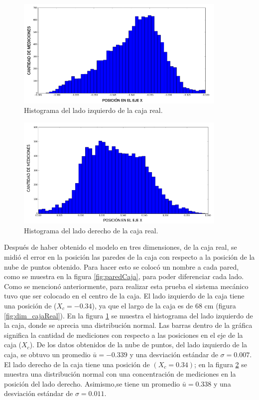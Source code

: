 \begin{figure}
  \centering \footnotesize
  \includegraphics[width=0.90\textwidth]{images/hist_izquierda_caja.png}
  \captionsetup{font=footnotesize}
  \caption{Histograma del lado izquierdo de la caja real.}
  \label{fig:hist_Izq}
\end{figure}

\begin{figure}
  \centering \footnotesize
  \includegraphics[width=0.90\textwidth]{images/hist_derecha_caja.png}
  \captionsetup{font=footnotesize}
  \caption{Histograma del lado derecho de la caja real.}
  \label{fig:hist_Dere}
\end{figure}

Después de haber obtenido el modelo en tres dimensiones, de la caja real, se midió 
el error en la posición las paredes de la caja con respecto a la posición de la nube 
de puntos obtenido. Para hacer esto se colocó un nombre a cada pared, como se muestra en 
la figura \ref{fig:paredCaja}, para poder diferenciar cada lado. Como se mencionó 
anteriormente, para realizar esta prueba el sistema mecánico tuvo que ser colocado en 
el centro de la caja. El lado izquierdo de la caja tiene una posición de ($X_{c} = 
-0.34$), ya que el largo de la caja es de 68 cm (figura \ref{fig:dim_cajaReal}). En 
la figura \ref{fig:hist_Izq} se muestra el histograma del lado izquierdo de la caja, 
donde se aprecia una distribución normal. Las barras dentro de la gráfica significa la
cantidad de mediciones con respecto a las posiciones en el eje de la caja ($X_{c}$). De los 
datos obtenidos de la nube de puntos, del lado izquierdo de la caja, se obtuvo un 
promedio $\bar{u} = -0.339$ y una desviación estándar de $\sigma = 0.007$. El lado 
derecho de la caja tiene una posición de $(X_{c} = 0.34)$; en la figura \ref{fig:hist_Dere} 
se muestra una distribución normal con una concentración de mediciones en la posición del 
lado derecho. Asimismo,se tiene un promedio $\bar{u} = 0.338$ y una desviación estándar 
de $\sigma = 0.011$.  

